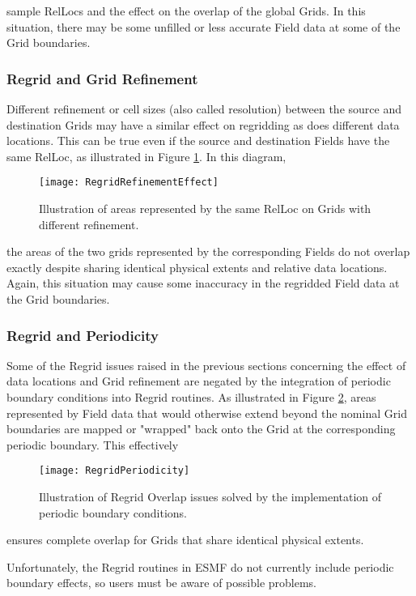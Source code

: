 sample RelLocs and the effect on the overlap of the global Grids.  In this
situation, there may be some unfilled or less accurate Field data at some of the
Grid boundaries.


\subsubsection{Regrid and Grid Refinement}

Different refinement or cell sizes (also called resolution) between the source
and destination Grids may have a similar effect on regridding as does different
data locations. This can be true even if the source and destination Fields have
the same RelLoc, as illustrated in Figure \ref{fig:RegridRefinementEffect}.  In
this diagram,

\begin{center}
\begin{figure}
\caption{Illustration of areas represented by the same RelLoc on Grids with
         different refinement. }
\label{fig:RegridRefinementEffect}
\resizebox{\textwidth}{!}
  {\texttt{[image: RegridRefinementEffect]}}
\end{figure}
\end{center}

the areas of the two grids represented by the corresponding Fields do not overlap
exactly despite sharing identical physical extents and relative data locations.
Again, this situation may cause some inaccuracy in the regridded Field data at
the Grid boundaries.


\subsubsection{Regrid and Periodicity}

Some of the Regrid issues raised in the previous sections concerning the effect
of data locations and Grid refinement are negated by the integration of
periodic boundary conditions into Regrid routines.  As illustrated in
Figure \ref{fig:RegridPeriodicity}, areas represented by Field data that
would otherwise extend beyond the nominal Grid boundaries are mapped or "wrapped"
back onto the Grid at the corresponding periodic boundary.  This effectively 

\begin{center}
\begin{figure}
\caption{Illustration of Regrid Overlap issues solved by the implementation
         of periodic boundary conditions. }
\label{fig:RegridPeriodicity}
\resizebox{\textwidth}{!}
  {\texttt{[image: RegridPeriodicity]}}
\end{figure}
\end{center}

ensures complete overlap for Grids that share identical physical extents.

Unfortunately, the Regrid routines in ESMF do not currently include periodic
boundary effects, so users must be aware of possible problems.
